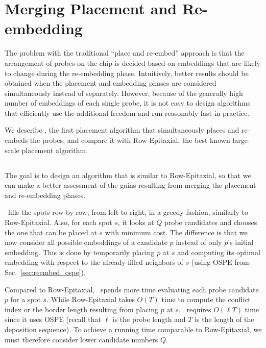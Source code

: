 \chapter{Merging Placement and Re-embedding}
\label{ch:merge}

The problem with the traditional ``place and re-embed'' approach is that the
arrangement of probes on the chip is decided based on embeddings that are
likely to change during the re-embedding phase. Intuitively, better results
should be obtained when the placement and embedding phases are considered
simultaneously instead of separately. However, because of the generally high
number of embeddings of each single probe, it is not easy to design algorithms
that efficiently use the additional freedom and run reasonably fast in
practice.

We describe \Greedyplus , the first placement algorithm that simultaneously
places and re-embeds the probes, and compare it with Row-Epitaxial, the best
known large-scale placement algorithm.

\section{\Greedyplus}
\label{sec:merge_greedyplus}

The goal is to design an algorithm that is similar to Row-Epitaxial, so that we
can make a better assessment of the gains resulting from merging the placement
and re-embedding phases.

\Greedyplus\ fills the spots row-by-row, from left to right, in a
greedy fashion, similarly to Row-Epitaxial. Also, for each spot $s$,
it looks at $Q$ probe candidates and chooses the one that can be
placed at $s$ with minimum cost. The difference is that we now
consider all possible embeddings of a candidate $p$ instead of only
$p$'s initial embedding. This is done by temporarily placing $p$ at
$s$ and computing its optimal embedding with respect to the
already-filled neighbors of $s$ (using OSPE from
Sec.~\ref{sec:reembed_ospe}).

Compared to Row-Epitaxial, \Greedyplus\ spends more time evaluating each probe
candidate $p$ for a spot $s$. While Row-Epitaxial takes $O(T)$ time to compute
the conflict index or the border length resulting from placing $p$ at $s$,
\Greedyplus\ requires $O(\ell T)$ time since it uses OSPE (recall that $\ell$
is the probe length and $T$ is the length of the deposition sequence). To
achieve a running time comparable to Row-Epitaxial, we must therefore consider
lower candidate numbers $Q$.

